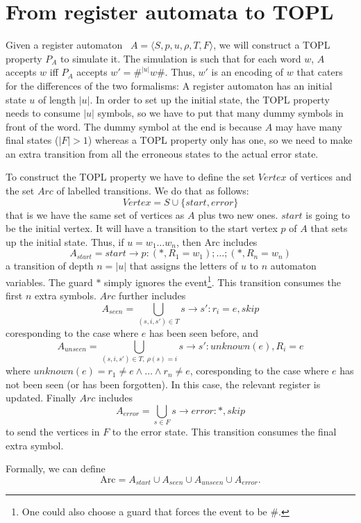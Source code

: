 \section{From register automata to TOPL}
Given a register automaton~\cite{dblp:journals/tcs/kaminskif94} $A=\langle S, p, u, \rho, T,
F\rangle$, we will construct a TOPL property $P_A$ to simulate it. The
simulation is such that for each word $w$, $A$ accepts $w$ iff $P_A$
accepts $w' = \#^{|u|}w\#$.  Thus, $w'$ is an encoding of $w$ that
caters for the differences of the two formalisms: A register automaton has an
initial state $u$ of length $|u|$. In order to set up the initial
state, the TOPL property needs to consume $|u|$ symbols, so we have to
put that many dummy symbols in front of the word. The dummy symbol at
the end is because $A$ may have many final states ($|F| > 1$) whereas a TOPL
property only has one, so we need to make an extra transition from all
the erroneous states to the actual error state.

\newcommand{\Vertex}{\mathit{Vertex}}
\newcommand{\Arc}{\mathit{Arc}}
To construct the TOPL property we have to define the set $\Vertex$
of vertices and the set $\Arc$ of labelled transitions. We do that as follows:
\[
\Vertex = S \cup \{start, error\}
\]
that is we have the same set of vertices as $A$ plus two new
ones. $start$ is going to be the initial vertex. It will have a
transition to the start vertex $p$ of $A$ that sets up the
initial state. Thus, if $u = w_1\ldots w_n$, then Arc includes
\[
A_{start} = start \to p: (*,R_1=w_1);\ldots;(*,R_n=w_n)
\]
a transition of depth $n = |u|$ that assigns the letters of $u$
to $n$ automaton variables. The guard $*$ simply ignores the
event\footnote{One could also choose a guard that forces the event
to be \#.}. This transition consumes the first $n$ extra
symbols. $\Arc$ further includes
\[
A_{seen} = \bigcup_{(s, i, s') \in T} s\to s': r_i=e, skip
\]
coresponding to the case where $e$ has been seen before, and
\[
A_{unseen} = \bigcup_{(s, i, s') \in T,\ \rho(s)=i} s\to s': unknown(e), R_i=e
\]
where $unknown(e) = r_1 \neq e \land \ldots \land r_n \neq e$,
coresponding to the case where $e$ has not been seen (or has been
forgotten). In this case, the relevant register is
updated. Finally $\Arc$ includes
\[
A_{error} = \bigcup_{s\in F} s\to error: *, skip
\]
to send the vertices in $F$ to the error state. This transition
consumes the final extra symbol.

Formally, we can define
\[
\mathrm{Arc} = A_{start} \cup A_{seen} \cup A_{unseen} \cup A_{error}.
\]
